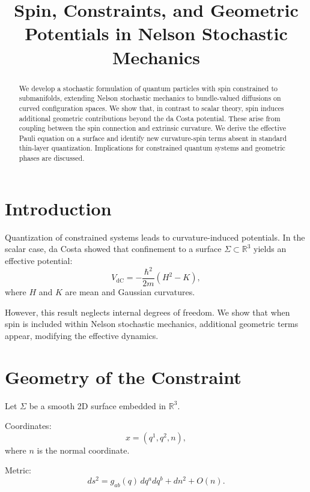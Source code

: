 \documentclass[11pt]{article}
\title{Spin, Constraints, and Geometric Potentials in Nelson Stochastic Mechanics}
\author{}
\date{}
\begin{document}
\maketitle

\begin{abstract}
We develop a stochastic formulation of quantum particles with spin constrained to submanifolds, extending Nelson stochastic mechanics to bundle-valued diffusions on curved configuration spaces. We show that, in contrast to scalar theory, spin induces additional geometric contributions beyond the da Costa potential. These arise from coupling between the spin connection and extrinsic curvature. We derive the effective Pauli equation on a surface and identify new curvature-spin terms absent in standard thin-layer quantization. Implications for constrained quantum systems and geometric phases are discussed.
\end{abstract}

\section{Introduction}

Quantization of constrained systems leads to curvature-induced potentials. In the scalar case, da Costa showed that confinement to a surface $\Sigma \subset \mathbb{R}^3$ yields an effective potential:
\begin{equation}
V_{\text{dC}} = -\frac{\hbar^2}{2m}(H^2 - K),
\end{equation}
where $H$ and $K$ are mean and Gaussian curvatures.

However, this result neglects internal degrees of freedom. We show that when spin is included within Nelson stochastic mechanics, additional geometric terms appear, modifying the effective dynamics.

\section{Geometry of the Constraint}

Let $\Sigma$ be a smooth 2D surface embedded in $\mathbb{R}^3$.

Coordinates:
\begin{equation}
x = (q^1,q^2,n),
\end{equation}
where $n$ is the normal coordinate.

Metric:
\begin{equation}
ds^2 = g_{ab}(q)\,dq^a dq^b + dn^2 + O(n).
\end{equation}
\end{document}
